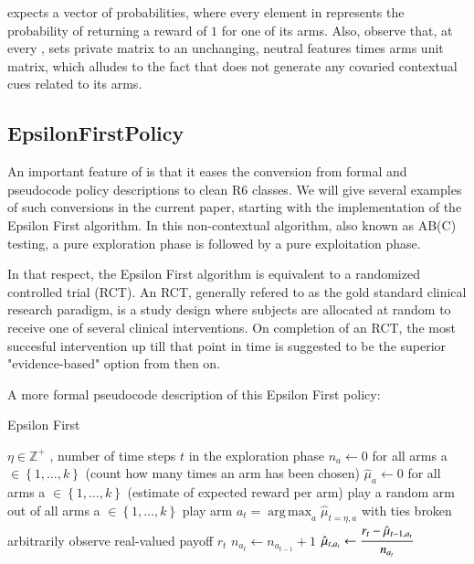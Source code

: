 \documentclass{jss}\usepackage[]{graphicx}\usepackage[]{color}
\DeclareMathOperator*{\argmax}{arg\,max}
\begin{document}
 expects a  vector of probabilities, where every element in  represents the probability of  returning a reward of $1$ for one of its  arms. Also, observe that, at every ,  sets private  matrix  to an unchanging, neutral  features times  arms unit matrix, which alludes to the fact that  does not generate any covaried contextual cues related to its arms.

\subsection{EpsilonFirstPolicy}

An important feature of  is that it eases the conversion from formal and pseudocode policy descriptions to clean R6 classes. We will give several examples of such conversions in the current paper, starting with the implementation of the Epsilon First algorithm. In this non-contextual algorithm, also known as AB(C) testing, a pure exploration phase is followed by a pure exploitation phase.

In that respect, the Epsilon First algorithm is equivalent to a randomized controlled trial (RCT). An RCT, generally refered to as the gold standard clinical research paradigm, is a study design where subjects are allocated at random to receive one of several clinical interventions. On completion of an RCT, the most succesful intervention up till that point in time is suggested to be the superior "evidence-based" option from then on.

A more formal pseudocode description of this Epsilon First policy:

\begin{algorithm}[H]
\caption{Epsilon First}
\label{Alg:EpsilonFirst}
\begin{algorithmic}
\REQUIRE \(   \eta \in \mathbb{Z}^{+} \)  , number of time steps $t$ in the exploration phase
\STATE \( n_{a} \leftarrow 0 \) for all arms a \(  \in \left\{ 1, \dots, k \right\} \)  (count how many times an arm has been chosen)
\STATE \( \hat{\mu}_{a} \leftarrow 0 \) for all arms a  \(   \in \left\{ 1, \dots, k \right\} \)  (estimate of expected reward per arm)
	       \STATE play a random arm out of all arms a \(   \in \left\{ 1, \dots, k \right\} \)
	\ELSE
	        \STATE play arm \(a_t = \argmax_a  \hat{\mu}_{t=\eta,a}  \) with ties broken arbitrarily
	\ENDIF
	\STATE observe real-valued payoff $r_t$
	\STATE \( n_{a_{t}} \leftarrow n_{a_{t-1}} + 1  \)
   \STATE \( \hat{\mu}_{t,a_{t}} \leftarrow   \cfrac{r_t - \hat{\mu}_{t-1,a_{t}} }{n_{a_{t}}}   \)
\ENDFOR
\end{algorithmic}
\end{algorithm}
\end{document}

